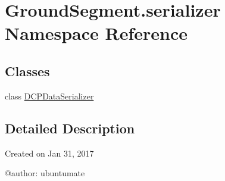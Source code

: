 \hypertarget{namespace_ground_segment_1_1serializer}{}\section{Ground\+Segment.\+serializer Namespace Reference}
\label{namespace_ground_segment_1_1serializer}
\subsection*{Classes}
\begin{DoxyCompactItemize}
\item 
class \hyperlink{class_ground_segment_1_1serializer_1_1_d_c_p_data_serializer}{D\+C\+P\+Data\+Serializer}
\end{DoxyCompactItemize}


\subsection{Detailed Description}
\begin{DoxyVerb}Created on Jan 31, 2017

@author: ubuntumate
\end{DoxyVerb}
 